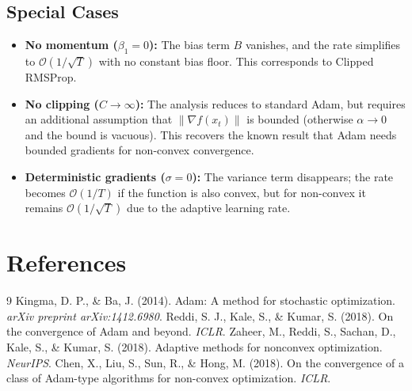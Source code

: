 \documentclass{article}
\newcommand{\norm}[1]{\left\| #1 \right\|}
\begin{document}
\subsection*{Special Cases}
\begin{itemize}
    \item \textbf{No momentum ($\beta_1=0$):} The bias term $B$ vanishes, and the rate simplifies to $\mathcal{O}(1/\sqrt{T})$ with no constant bias floor. This corresponds to Clipped RMSProp.
    \item \textbf{No clipping ($C \to \infty$):} The analysis reduces to standard Adam, but requires an additional assumption that $\norm{\nabla f(x_t)}$ is bounded (otherwise $\alpha \to 0$ and the bound is vacuous). This recovers the known result that Adam needs bounded gradients for non-convex convergence.
    \item \textbf{Deterministic gradients ($\sigma=0$):} The variance term disappears; the rate becomes $\mathcal{O}(1/T)$ if the function is also convex, but for non-convex it remains $\mathcal{O}(1/\sqrt{T})$ due to the adaptive learning rate.
\end{itemize}

\section*{References}
\begin{thebibliography}{9}
 Kingma, D. P., \& Ba, J. (2014). Adam: A method for stochastic optimization. \textit{arXiv preprint arXiv:1412.6980}.
 Reddi, S. J., Kale, S., \& Kumar, S. (2018). On the convergence of Adam and beyond. \textit{ICLR}.
 Zaheer, M., Reddi, S., Sachan, D., Kale, S., \& Kumar, S. (2018). Adaptive methods for nonconvex optimization. \textit{NeurIPS}.
 Chen, X., Liu, S., Sun, R., \& Hong, M. (2018). On the convergence of a class of Adam-type algorithms for non-convex optimization. \textit{ICLR}.
\end{thebibliography}
\end{document}
